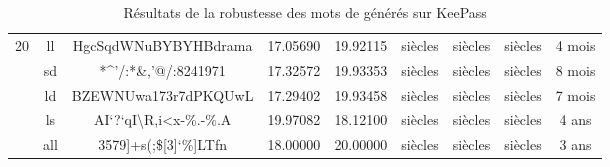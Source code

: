 \begin{table}[H]
{\begin{tabular}{lcccccccc}
			\multirow{5}{*}{20}                               & ll                           & HgcSqdWNuBYBYHBdrama                             & 17.05690                                                                            & 19.92115                                                                                       & siècles                                                            & siècles                                                              & siècles                                                              & 4 mois                                                             \\ \cline{2-9} 
			& sd                           & *\textasciicircum'/:*\&,\textbraceleft '@/:8241971                      & 17.32572                                                                            & 19.93353                                                                                        & siècles                                                            & siècles                                                              & siècles                                                              & 8 mois                                                            \\ \cline{2-9} 
			& ld                           & BZEWNUwa173r7dPKQUwL                             & 17.29402                                                                           & 19.93458                                                                                      & siècles                                                            & siècles                                                              & siècles                                                              & 7 mois                                                               \\ \cline{2-9} 
			& ls                           & AI`?`qI\textbackslash R,i<x-\%.-\%.A                         & 19.97082                                                                           & 18.12100                                                                                      & siècles                                                            & siècles                                                              & siècles                                                              & 4 ans                                                                \\ \cline{2-9} 
			& all                          & 3579]+s(;\$[3]`\%]LTfn                            & 18.00000                                                                            & 20.00000                                                                                        & siècles                                                            & siècles                                                              & siècles                                                              & 3 ans                                                              \\ \hline\toprule
		\end{tabular}}
\caption{Résultats de la robustesse des mots de générés sur KeePass}
\label{kp_result}
\end{table}

